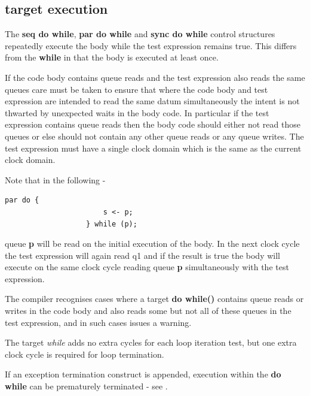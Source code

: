         \subsection{target execution}

            The {\bf seq do while}, {\bf par do while} and {\bf sync do
            while} control structures repeatedly execute the body while the
            test expression remains true. This differs from the {\bf while}
            in that the body is executed at least once.
            
            If the code body contains queue reads and the test expression also
            reads the same queues care must be taken to ensure that where the
            code body and test expression are intended to read the same datum
            simultaneously the intent is not thwarted by unexpected waits in
            the body code. In particular if the test expression contains
            queue reads then the body code should either not read those queues
            or else should not contain any other queue reads or any queue writes.
            The test expression must have a single clock domain which is the
            same as the current clock domain.          
            
            Note that in the following -
            \begin{lstlisting}[gobble=12, language=threepl]
                   par do {
                       s <- p;
                   } while (p);
            \end{lstlisting}
            queue {\bf p} will be read on the initial execution of the body.
            In the next clock cycle the test expression will again read q1
            and if the result is true the body will execute on the same
            clock cycle reading queue {\bf p} simultaneously with the test
            expression.
                        
            The compiler recognises cases where a target {\bf do while()} contains
            queue reads or writes in the code body and also reads some but not
            all of these queues in the test expression, and in such cases issues
            a warning.
            
            The target {\em while} adds no extra cycles for each loop
            iteration test, but one extra clock cycle is required for
            loop termination.

            If an exception termination construct is appended, execution within
            the {\bf do while} can be prematurely terminated
            - see .



